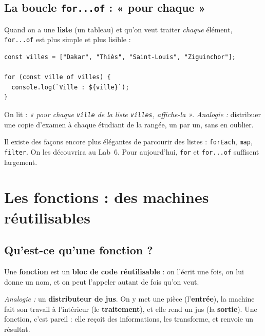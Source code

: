 \documentclass[11pt,a4paper]{article}
\newcommand{\code}[1]{\texttt{#1}}
\begin{document}
\subsection{La boucle \code{for...of} : « pour chaque »}

Quand on a une \textbf{liste} (un tableau) et qu'on veut traiter \emph{chaque} élément, \code{for...of} est plus simple et plus lisible :

\begin{lstlisting}[style=js]
const villes = ["Dakar", "Thiès", "Saint-Louis", "Ziguinchor"];

for (const ville of villes) {
  console.log(`Ville : ${ville}`);
}
\end{lstlisting}

On lit : \emph{« pour chaque \code{ville} de la liste \code{villes}, affiche-la »}. \emph{Analogie :} distribuer une copie d'examen à chaque étudiant de la rangée, un par un, sans en oublier.

\begin{infobox}
Il existe des façons encore plus élégantes de parcourir des listes : \code{forEach}, \code{map}, \code{filter}. On les découvrira au Lab~6. Pour aujourd'hui, \code{for} et \code{for...of} suffisent largement.
\end{infobox}

\section{Les fonctions : des machines réutilisables}

\subsection{Qu'est-ce qu'une fonction ?}

Une \textbf{fonction} est un \textbf{bloc de code réutilisable} : on l'écrit une fois, on lui donne un nom, et on peut l'appeler autant de fois qu'on veut.

\emph{Analogie :} un \textbf{distributeur de jus}. On y met une pièce (l'\textbf{entrée}), la machine fait son travail à l'intérieur (le \textbf{traitement}), et elle rend un jus (la \textbf{sortie}). Une fonction, c'est pareil : elle reçoit des informations, les transforme, et renvoie un résultat.
\end{document}
